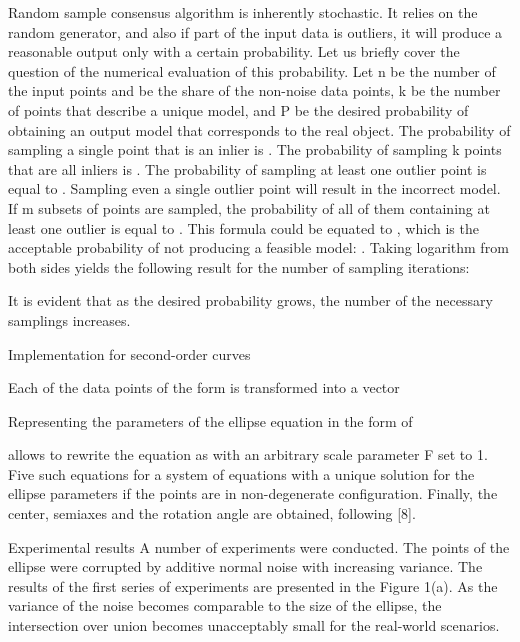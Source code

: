 Random sample consensus algorithm is inherently stochastic. It relies on the random generator, and also if part of the input data is outliers, it will produce a reasonable output only with a certain probability. Let us briefly cover the question of the numerical evaluation of this probability. Let n be the number of the input points and 
 be the share of the non-noise data points, k be the number of points that describe a unique model, and P be the desired probability of obtaining an output model that corresponds to the real object. The probability of sampling a single point that is an inlier is . The probability of sampling k points that are all inliers is . The probability of sampling at least one outlier point is equal to . Sampling even a single outlier point will result in the incorrect model. If m subsets of points are sampled, the probability of all of them containing at least one outlier is equal to . This formula could be equated to , which is the acceptable probability of not producing a feasible model: . Taking logarithm from both sides yields the following result for the number of sampling iterations: 

It is evident that as the desired probability grows, the number of the necessary samplings increases.

Implementation for second-order curves 

Each of the data points of the form  is transformed into a vector


Representing the parameters of the ellipse equation in the form of


allows to rewrite the equation  as  with an arbitrary scale parameter F set to 1. Five such equations for a system of equations with a unique solution for the ellipse parameters if the points are in non-degenerate configuration. Finally, the center, semiaxes and the rotation angle are obtained, following [8].











Experimental results
A number of experiments were conducted. The points of the ellipse were corrupted by additive normal noise with increasing variance. The results of the first series of experiments are presented in the Figure 1(a). As the variance of the noise becomes comparable to the size of the ellipse, the intersection over union becomes unacceptably small for the real-world scenarios.

